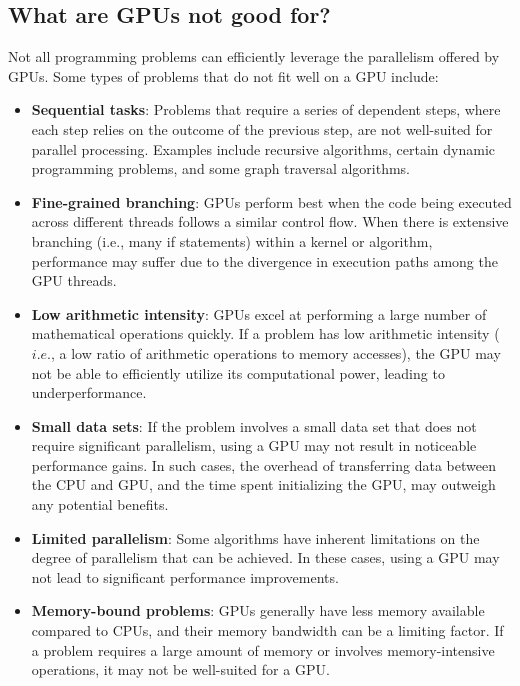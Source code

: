 \subsection{What are GPUs not good for?}


\par
Not all programming problems can efficiently leverage the parallelism offered by GPUs.
Some types of problems that do not fit well on a GPU include:
\begin{itemize}
    \item \textbf{Sequential tasks}: Problems that require a series of dependent steps, where each step relies on the outcome of the previous step, are not well-suited for parallel processing. Examples include recursive algorithms, certain dynamic programming problems, and some graph traversal algorithms.
    \item \textbf{Fine-grained branching}: GPUs perform best when the code being executed across different threads follows a similar control flow. When there is extensive branching (i.e., many if statements) within a kernel or algorithm, performance may suffer due to the divergence in execution paths among the GPU threads.
    \item \textbf{Low arithmetic intensity}: GPUs excel at performing a large number of mathematical operations quickly. If a problem has low arithmetic intensity ($i.e.$, a low ratio of arithmetic operations to memory accesses), the GPU may not be able to efficiently utilize its computational power, leading to underperformance.
    \item \textbf{Small data sets}: If the problem involves a small data set that does not require significant parallelism, using a GPU may not result in noticeable performance gains. In such cases, the overhead of transferring data between the CPU and GPU, and the time spent initializing the GPU, may outweigh any potential benefits.
    \item \textbf{Limited parallelism}: Some algorithms have inherent limitations on the degree of parallelism that can be achieved. In these cases, using a GPU may not lead to significant performance improvements.
    \item \textbf{Memory-bound problems}: GPUs generally have less memory available compared to CPUs, and their memory bandwidth can be a limiting factor. If a problem requires a large amount of memory or involves memory-intensive operations, it may not be well-suited for a GPU.
\end{itemize}


